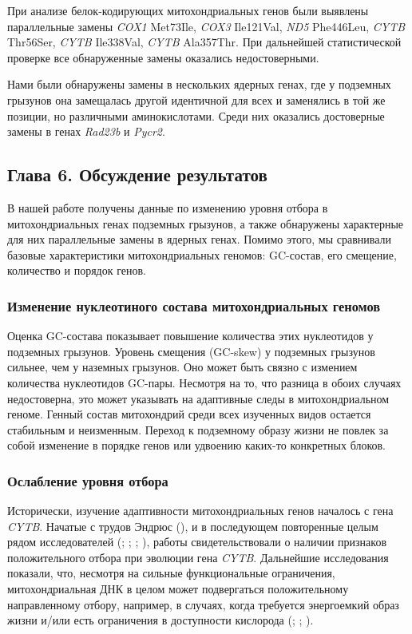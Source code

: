 При анализе белок-кодирующих митохондриальных генов были выявлены параллельные замены \textit{COX1} Met73Ile, \textit{COX3} Ile121Val, \textit{ND5} Phe446Leu, \textit{CYTB} Thr56Ser, \textit{CYTB} Ile338Val, \textit{CYTB} Ala357Thr. При дальнейшей статистической проверке все обнаруженные замены оказались недостоверными. 

Нами были обнаружены замены в нескольких ядерных генах, где у подземных грызунов она замещалась другой идентичной для всех и заменялись в той же позиции, но различными аминокислотами. Среди них оказались достоверные замены в генах \textit{Rad23b} и \textit{Pycr2}.


\subsection*{Глава 6. Обсуждение результатов}

В нашей работе получены данные по изменению уровня отбора в митохондриальных генах подземных грызунов, а также обнаружены характерные для них параллельные замены в ядерных генах. Помимо этого, мы сравнивали базовые характеристики митохондриальных геномов: GC-состав, его смещение, количество и порядок генов. 

\subsubsection*{Изменение нуклеотиного состава митохондриальных геномов}
Оценка GC-состава показывает повышение количества этих нуклеотидов у подземных грызунов. Уровень смещения (GC-skew) у подземных грызунов сильнее, чем у наземных грызунов. Оно может быть связно с измением количества нуклеотидов GC-пары. Несмотря на то, что разница в обоих случаях недостоверна, это может указывать на адаптивные следы в митохондриальном геноме. Генный состав митохондрий среди всех изученных видов остается стабильным и неизменным. Переход к подземному образу жизни не повлек за собой изменение в порядке генов или удвоению каких-то конкретных блоков.


\subsubsection*{Ослабление уровня отбора}
Исторически, изучение адаптивности митохондриальных генов началось с гена \textit{CYTB}. Начатые с трудов Эндрюс (\cite{Andrews1998}), и в последующем повторенные целым рядом исследователей (\cite{Tomasco2014}; \cite{DaSilva2009}; \cite{DiRocco2006}; \cite{Shao2015}), работы свидетельствовали о наличии признаков положительного отбора при эволюции гена \textit{CYTB}. Дальнейшие исследования показали, что, несмотря на сильные функциональные ограничения, митохондриальная ДНК в целом может подвергаться положительному направленному отбору, например, в случаях, когда требуется энергоемкий образ жизни и/или есть ограничения в доступности кислорода (\cite{Tomasco2011}; \cite{Shen2010}; \cite{Blier2001}).


